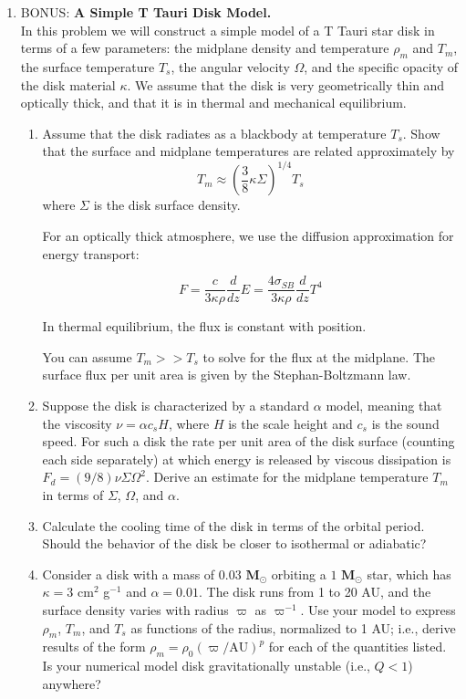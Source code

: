 \documentclass{article}
\newcommand{\msun}{\ensuremath{\textbf{M}_\odot}}
\begin{document}
\begin{enumerate}
\item BONUS: {\bf A Simple T Tauri Disk Model.}\\
In this problem we will construct a simple model of a T Tauri star disk in terms of a few parameters: the midplane density and temperature $\rho_m$ and $T_m$, the surface temperature $T_s$, the angular velocity $\Omega$, and the specific opacity of the disk material $\kappa$. We assume that the disk is very geometrically thin and optically thick, and that it is in thermal and mechanical equilibrium.
\begin{enumerate}
    \item

Assume that the disk radiates as a blackbody at temperature $T_s$. Show that the surface and midplane temperatures are related approximately by
$$
T_m \approx \left(\frac{3}{8}\kappa\Sigma\right)^{1/4} T_s
$$
where $\Sigma$ is the disk surface density.

For an optically thick atmosphere, we use the diffusion approximation for energy transport:

$$F = \frac{c}{3 \kappa \rho} \frac{d}{dz}{E} = \frac{4 \sigma_{SB}}{3\kappa \rho} \frac{d}{dz}T^4$$

In thermal equilibrium, the flux is constant with position.  

You can assume $T_m >> T_s$ to solve for the flux at the midplane.  The surface flux per unit area is given by the Stephan-Boltzmann law.

\item Suppose the disk is characterized by a standard $\alpha$ model, meaning that the viscosity $\nu=\alpha c_s H$, where $H$ is the scale height and $c_s$ is the sound speed. For such a disk the rate per unit area of the disk surface (counting each side separately) at which energy is released by viscous dissipation is $F_d=(9/8) \nu \Sigma \Omega^2$. Derive an estimate for the midplane temperature $T_m$ in terms of $\Sigma$, $\Omega$, and $\alpha$.
\item Calculate the cooling time of the disk in terms of the orbital period. Should the behavior of the disk be closer to isothermal or adiabatic?
\item Consider a disk with a mass of $0.03$ $\msun$ orbiting a $1$ $\msun$ star, which has $\kappa=3$ cm$^2$ g$^{-1}$ and $\alpha=0.01$. The disk runs from 1 to 20 AU, and the surface density varies with radius $\varpi$ as $\varpi^{-1}$. Use your model to express $\rho_m$, $T_m$, and $T_s$ as functions of the radius, normalized to 1 AU; i.e., derive results of the form $\rho_m = \rho_0 (\varpi/\mathrm{AU})^p$ for each of the quantities listed. Is your numerical model disk gravitationally unstable (i.e., $Q<1$) anywhere?
\end{enumerate}



\end{enumerate}
\end{document}
